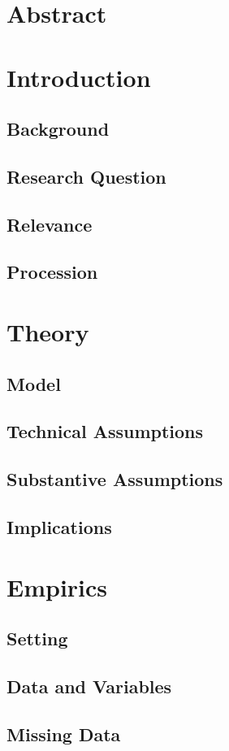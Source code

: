 \section*{Abstract}
\section*{Introduction}
\subsection{Background}
\subsection{Research Question}
\subsection{Relevance}
\subsection{Procession}
\section*{Theory}
\subsection{Model}
\subsection{Technical Assumptions}
\subsection{Substantive Assumptions}
\subsection{Implications}
\section*{Empirics}
\subsection{Setting}
\subsection{Data and Variables}
\subsection{Missing Data}
